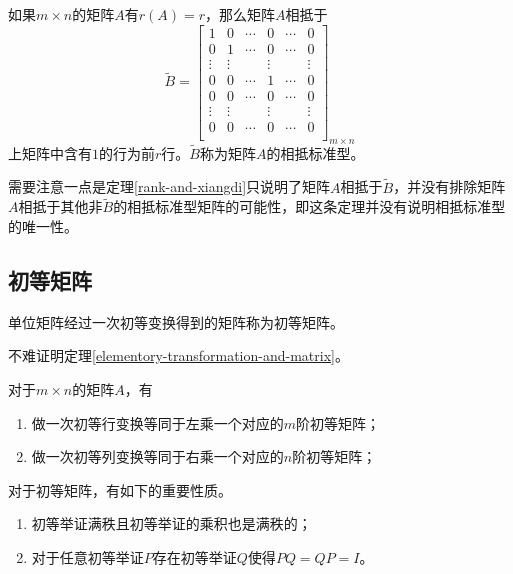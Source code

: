 \begin{thm}
    \label{rank-and-xiangdi}
    如果$m\times n$的矩阵$A$有$r(A)=r$，那么矩阵$A$相抵于
    $$
    \tilde{B}=\begin{bmatrix}
        1 & 0 & \cdots & 0 & \cdots & 0 \\
        0 & 1 & \cdots & 0 & \cdots & 0 \\
        \vdots & \vdots & & \vdots & & \vdots \\
        0 & 0 & \cdots & 1 & \cdots & 0 \\
        0 & 0 & \cdots & 0 & \cdots & 0 \\
        \vdots & \vdots & & \vdots & & \vdots \\
        0 & 0 & \cdots & 0 & \cdots & 0 \\
    \end{bmatrix}_{m\times n}
    $$
    上矩阵中含有$1$的行为前$r$行。$\tilde{B}$称为矩阵$A$的相抵标准型。
\end{thm}
需要注意一点是定理\ref{rank-and-xiangdi}只说明了矩阵$A$相抵于$\tilde{B}$，并没有排除矩阵$A$相抵于其他非$\tilde{B}$的相抵标准型矩阵的可能性，即这条定理并没有说明相抵标准型的唯一性。

\subsection{初等矩阵}

\begin{definition}
    \label{elementory-matrix}
    单位矩阵经过一次初等变换得到的矩阵称为初等矩阵。
\end{definition}

不难证明定理\ref{elementory-transformation-and-matrix}。

\begin{thm}
    \label{elementory-transformation-and-matrix}
    对于$m\times n$的矩阵$A$，有
    \begin{enumerate}
        \item 做一次初等行变换等同于左乘一个对应的$m$阶初等矩阵；
        \item 做一次初等列变换等同于右乘一个对应的$n$阶初等矩阵；
    \end{enumerate}
\end{thm}

对于初等矩阵，有如下的重要性质。

\begin{property}
    \label{elementory-matrix-property}
    \begin{enumerate}
        \item 初等举证满秩且初等举证的乘积也是满秩的；
        \item 对于任意初等举证$P$存在初等举证$Q$使得$PQ=QP=I$。
    \end{enumerate}
\end{property}

